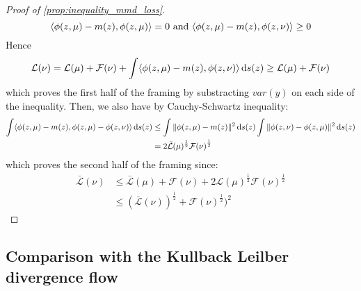 \begin{proof}[Proof of \cref{prop:inequality_mmd_loss}]
\begin{equation*}
\langle \phi(z,\mu)-m(z),\phi(z,\mu) \rangle=0\text{ and }\langle \phi(z,\mu)-m(z),\phi(z,\nu) \rangle\ge0
\end{equation*}
Hence 
\begin{equation*}
\mathcal{L}(\nu)=\mathcal{L}(\mu)+ \mathcal{F}(\nu)+ \int \langle \phi(z,\mu)-m(z),\phi(z,\nu) \rangle\mathop{}\!\mathrm{d} s(z)\ge \mathcal{L}(\mu)+ \mathcal{F}(\nu)
\end{equation*}
which proves the first half of the framing by substracting $var(y)$ on each side of the inequality. Then, we also have by Cauchy-Schwartz inequality:
\begin{align*}
\int \langle \phi(z,\mu)-m(z),\phi(z,\mu)- \phi(z,\nu) \rangle\mathop{}\!\mathrm{d} s(z)&\le\int \Vert \phi(z,\mu)-m(z)\Vert^2 \mathop{}\!\mathrm{d} s(z)\int \Vert \phi(z,\nu)-\phi(z,\mu)\Vert^2 \mathop{}\!\mathrm{d} s(z)\\
&=2 \bar{\mathcal{L}}(\mu)^{\frac12}\mathcal{F(\nu)}^{\frac12}
\end{align*}
which proves the second half of the framing since:
\begin{align*}
\bar{\mathcal{L}}(\nu)&\le \bar{\mathcal{L}}(\mu)+\mathcal{F}(\nu)+2\mathcal{L}(\mu)^{\frac12}\mathcal{F}(\nu)^{\frac12}\\
&\le(\bar{\mathcal{L}}(\nu))^{\frac12}+\mathcal{F}(\nu)^{\frac12})^2
\end{align*}
\end{proof}

\subsection{Comparison with the Kullback Leilber divergence flow}\label{subsec:kl_flow}



